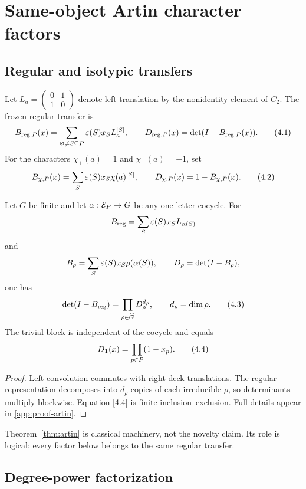 \section{Same-object Artin character factors}
\label{sec:factorization}

\subsection{Regular and isotypic transfers}

Let \(L_a=\left(\begin{smallmatrix}0&1\\1&0\end{smallmatrix}\right)\) denote
left translation by the nonidentity element of \(C_2\).  The frozen regular
transfer is
\[
B_{\mathrm{reg},P}(x)=
\sum_{\varnothing\ne S\subseteq P}\varepsilon(S)x_SL_a^{|S|},
\qquad
D_{\mathrm{reg},P}(x)=\det(I-B_{\mathrm{reg},P}(x)).
\tag{4.1}\label{4.1}
\]
For the characters \(\chi_+(a)=1\) and \(\chi_-(a)=-1\), set
\[
B_{\chi,P}(x)=\sum_S\varepsilon(S)x_S\chi(a)^{|S|},
\qquad D_{\chi,P}(x)=1-B_{\chi,P}(x).
\tag{4.2}\label{4.2}
\]

\begin{theorem}
\label{thm:artin}
Let \(G\) be finite and let \(\alpha:\mathcal E_P\to G\) be any one-letter cocycle.
For
\[
B_{\mathrm{reg}}=\sum_S\varepsilon(S)x_SL_{\alpha(S)}
\]
and
\[
B_\rho=\sum_S\varepsilon(S)x_S\rho(\alpha(S)),
\qquad D_\rho=\det(I-B_\rho),
\]
one has
\[
\det(I-B_{\mathrm{reg}})=\prod_{\rho\in\widehat G}D_\rho^{d_\rho},
\qquad d_\rho=\dim\rho.
\tag{4.3}\label{4.3}
\]
The trivial block is independent of the cocycle and equals
\[
D_{\mathbf 1}(x)=\prod_{p\in P}(1-x_p).
\tag{4.4}\label{4.4}
\]
\end{theorem}

\begin{proof}
Left convolution commutes with right deck translations.  The regular
representation decomposes into \(d_\rho\) copies of each irreducible
\(\rho\), so determinants multiply blockwise.  Equation \eqref{4.4} is finite
inclusion--exclusion.  Full details appear in \cref{app:proof-artin}.
\end{proof}

Theorem~\ref{thm:artin} is classical machinery, not the novelty claim.  Its
role is logical: every factor below belongs to the same regular transfer.

\subsection{Degree-power factorization}

